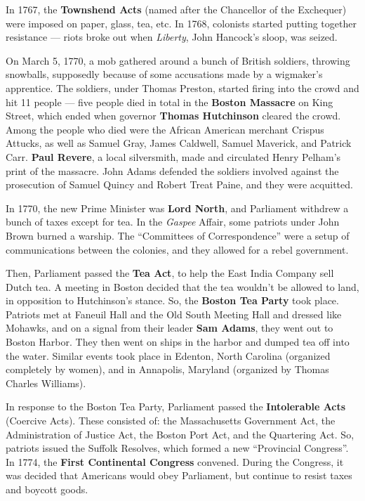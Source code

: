 In 1767, the \textbf{Townshend Acts} (named after the Chancellor of the Exchequer)
were imposed on paper, glass, tea, etc.
In 1768, colonists started putting together resistance ---
riots broke out when \textit{Liberty}, John Hancock's sloop, was seized.

On March 5, 1770, a mob gathered around a bunch of British soldiers, throwing snowballs,
supposedly because of some accusations made by a wigmaker's apprentice.
The soldiers, under Thomas Preston, started firing into the crowd and hit 11 people ---
five people died in total in the \textbf{Boston Massacre} on King Street,
which ended when governor \textbf{Thomas Hutchinson} cleared the crowd.
Among the people who died were the African American merchant Crispus Attucks,
as well as Samuel Gray, James Caldwell, Samuel Maverick, and Patrick Carr.
\textbf{Paul Revere}, a local silversmith, made and circulated Henry Pelham's print of the massacre.
John Adams defended the soldiers involved against the prosecution of Samuel Quincy and Robert Treat Paine,
and they were acquitted.

In 1770, the new Prime Minister was \textbf{Lord North},
and Parliament withdrew a bunch of taxes except for tea.
In the \textit{Gaspee} Affair, some patriots under John Brown burned a warship.
The ``Committees of Correspondence'' were a setup of communications between the colonies,
and they allowed for a rebel government.

Then, Parliament passed the \textbf{Tea Act}, to help the East India Company sell Dutch tea.
A meeting in Boston decided that the tea wouldn't be allowed to land,
in opposition to Hutchinson's stance.
So, the \textbf{Boston Tea Party} took place.
Patriots met at Faneuil Hall and the Old South Meeting Hall and dressed like Mohawks,
and on a signal from their leader \textbf{Sam Adams}, they went out to Boston Harbor.
They then went on ships in the harbor and dumped tea off into the water.
Similar events took place in Edenton, North Carolina (organized completely by women),
and in Annapolis, Maryland (organized by Thomas Charles Williams).

In response to the Boston Tea Party, Parliament passed the \textbf{Intolerable Acts} (Coercive Acts).
These consisted of:
the Massachusetts Government Act,
the Administration of Justice Act,
the Boston Port Act,
and the Quartering Act.
So, patriots issued the Suffolk Resolves, which formed a new ``Provincial Congress''.
In 1774, the \textbf{First Continental Congress} convened.
During the Congress, it was decided that Americans would obey Parliament,
but continue to resist taxes and boycott goods.

